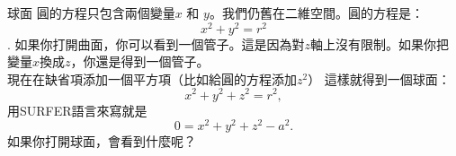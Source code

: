 \begin{surferPage}{球面}
圓的方程只包含兩個變量$x$ 和 $y$。我們仍舊在二維空間。圓的方程是：
\[x^2+y^2=r^2\].
如果你打開曲面，你可以看到一個管子。這是因為對$z$軸上沒有限制。如果你把變量$x$換成$z$，你還是得到一個管子。\\
現在在缺省項添加一個平方項（比如給圓的方程添加$z^2$）
這樣就得到一個球面：
\[x^2+y^2+z^2=r^2,\]
用SURFER語言來寫就是
\[0=x^2+y^2+z^2-a^2.\]
如果你打開球面，會看到什麼呢？
\end{surferPage}
